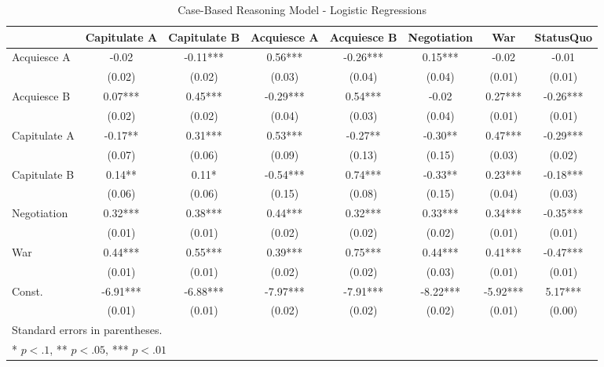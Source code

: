 \begin{landscape}
\begin{table}
	\begin{center}
	\caption{Case-Based Reasoning Model - Logistic Regressions}
	\label{table:cb_regressions}
	\begin{tabular}{lccccccc}
	\hline
	             & Capitulate A & Capitulate B & Acquiesce A & Acquiesce B & Negotiation & War      & StatusQuo   \\
	\hline
	Acquiesce A  & -0.02        & -0.11***     & 0.56***     & -0.26***    & 0.15***     & -0.02    & -0.01      \\
	             & (0.02)       & (0.02)       & (0.03)      & (0.04)      & (0.04)      & (0.01)   & (0.01)     \\
	Acquiesce B  & 0.07***      & 0.45***      & -0.29***    & 0.54***     & -0.02       & 0.27***  & -0.26***   \\
	             & (0.02)       & (0.02)       & (0.04)      & (0.03)      & (0.04)      & (0.01)   & (0.01)     \\
	Capitulate A & -0.17**      & 0.31***      & 0.53***     & -0.27**     & -0.30**     & 0.47***  & -0.29***   \\
	             & (0.07)       & (0.06)       & (0.09)      & (0.13)      & (0.15)      & (0.03)   & (0.02)     \\
	Capitulate B & 0.14**       & 0.11*        & -0.54***    & 0.74***     & -0.33**     & 0.23***  & -0.18***   \\
	             & (0.06)       & (0.06)       & (0.15)      & (0.08)      & (0.15)      & (0.04)   & (0.03)     \\
	Negotiation  & 0.32***      & 0.38***      & 0.44***     & 0.32***     & 0.33***     & 0.34***  & -0.35***   \\
	             & (0.01)       & (0.01)       & (0.02)      & (0.02)      & (0.02)      & (0.01)   & (0.01)     \\
	War          & 0.44***      & 0.55***      & 0.39***     & 0.75***     & 0.44***     & 0.41***  & -0.47***   \\
	             & (0.01)       & (0.01)       & (0.02)      & (0.02)      & (0.03)      & (0.01)   & (0.01)     \\
	Const.       & -6.91***     & -6.88***     & -7.97***    & -7.91***    & -8.22***    & -5.92*** & 5.17***    \\
	             & (0.01)       & (0.01)       & (0.02)      & (0.02)      & (0.02)      & (0.01)   & (0.00)     \\
	\hline
	\hline
	\multicolumn{8}{l}{Standard errors in parentheses.} \\
	\multicolumn{8}{l}{* $p<.1$, ** $p<.05$, *** $p<.01$} \\
	\end{tabular}
	\end{center}
	\tableSpace
\end{table}

\end{landscape}

